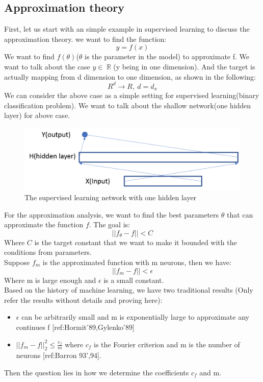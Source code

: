 \documentclass{article}
\DeclareMathOperator{\R}{\mathbb{R}}
\begin{document}
\subsection{Approximation theory}
First, let us start with an simple example in supervised learning to discuss the approximation theory. we want to find the function:
\[
y = f(x)
\] 
We want to find $f(\theta)$($\theta$ is the parameter in the model) to approximate f. We want to talk about the case $y{\in}\R$(y being in one dimension). And the target is actually mapping from d dimension to one dimension, as shown in the following:
\[
R^d \rightarrow R,~d=d_x
\] 
We can consider the above case as a simple setting for supervised learning(binary classification problem). We want to talk about the shallow network(one hidden layer) for above case.
\begin{figure}[H]
\centering
\includegraphics[scale=0.3]{hidden_layer_model.png}
\caption{The supervised learning network with one hidden layer}
\label{fig:univerise}
\end{figure}
For the approximation analysis, we want to find the best parameters $\theta$ that can approximate the function $f$. The goal is:
\[
||f_{\theta} - f|| < C
\]
Where $C$ is the target constant that we want to make it bounded with the conditions from parameters.\\
\noindent
Suppose $f_m$ is the approximated function with m neurons, then we have:
\[
||f_m - f|| < \epsilon
\]
Where m is large enough and $\epsilon$ is a small constant.\\
\noindent
Based on the history of machine learning, we have two traditional results (Only refer the results without details and proving here):
\begin{itemize}
\item $\epsilon$ can be arbitrarily small and m is exponentially large to approximate any continues f [ref:Hormit'89,Gylenko'89]
\item $||f_m - f||^2_2 {\leq} \frac{c_f}{m}$ where $c_f$ is the Fourier criterion and m is the number of neurons [ref:Barron 93',94].
\end{itemize}
Then the question lies in how we determine the coefficients $c_f$ and m. \\
\end{document}
